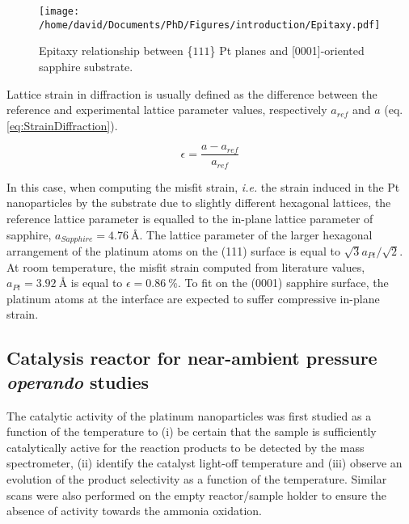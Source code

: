 \begin{figure}
    \centering
    \texttt{[image: /home/david/Documents/PhD/Figures/introduction/Epitaxy.pdf]}
    \caption{
        Epitaxy relationship between \{$111$\} Pt planes and [0001]-oriented sapphire substrate.
    }
    \label{fig:Epitaxy}
\end{figure}%

Lattice strain in diffraction is usually defined as the difference between the reference and experimental lattice parameter values, respectively $a_{ref}$ and $a$ (eq. \ref{eq:StrainDiffraction}).

\begin{equation}
    \epsilon = \frac{a - a_{ref}}{a_{ref}}
    \label{eq:StrainDiffraction}
\end{equation}

In this case, when computing the misfit strain, \textit{i.e.} the strain induced in the Pt nanoparticles by the substrate due to slightly different hexagonal lattices, the reference lattice parameter is equalled to the in-plane lattice parameter of sapphire, $a_{Sapphire} = \qty{4.76}{\angstrom}$.
The lattice parameter of the larger hexagonal arrangement of the platinum atoms on the (111) surface is equal to $\sqrt{3} a_{Pt} / \sqrt{2}$.
At room temperature, the misfit strain computed from literature values, $a_{Pt} = \qty{3.92}{\angstrom}$ \parencite{Waseda1975} is equal to $\epsilon = \qty{0.86}{\percent}$.
To fit on the (0001) sapphire surface, the platinum atoms at the interface are expected to suffer compressive in-plane strain.

\subsection{Catalysis reactor for near-ambient pressure \textit{operando} studies}

The catalytic activity of the platinum nanoparticles was first studied as a function of the temperature to (i) be certain that the sample is sufficiently catalytically active for the reaction products to be detected by the mass spectrometer, (ii) identify the catalyst light-off temperature and (iii) observe an evolution of the product selectivity as a function of the temperature.
Similar scans were also performed on the empty reactor/sample holder to ensure the absence of activity towards the ammonia oxidation.

